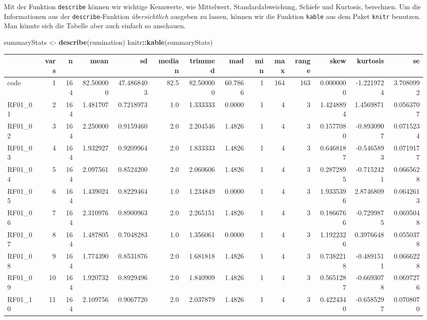 \documentclass[
  ngerman,
]{book}
\newenvironment{Shaded}{\begin{snugshade}}{\end{snugshade}}
\newcommand{\FunctionTok}[1]{\textcolor[rgb]{0.13,0.29,0.53}{\textbf{#1}}}
\newcommand{\NormalTok}[1]{#1}
\newcommand{\OtherTok}[1]{\textcolor[rgb]{0.56,0.35,0.01}{#1}}
\newcommand{\SpecialCharTok}[1]{\textcolor[rgb]{0.81,0.36,0.00}{\textbf{#1}}}
\begin{document}
Mit der Funktion \texttt{describe} können wir wichtige Kennwerte, wie Mittelwert, Standardabweichung, Schiefe und Kurtosis, berechnen. Um die Informationen aus der \texttt{describe}-Funktion \emph{übersichtlich} ausgeben zu lassen, können wir die Funktion \texttt{kable} aus dem Paket \texttt{knitr} benutzen. Man könnte sich die Tabelle aber auch einfach so anschauen.

\begin{Shaded}
\begin{Highlighting}[]
\NormalTok{summaryStats }\OtherTok{\textless{}{-}} \FunctionTok{describe}\NormalTok{(rumination)}
\NormalTok{knitr}\SpecialCharTok{::}\FunctionTok{kable}\NormalTok{(summaryStats)}
\end{Highlighting}
\end{Shaded}

\begin{tabular}{l|r|r|r|r|r|r|r|r|r|r|r|r|r}
\hline
  & vars & n & mean & sd & median & trimmed & mad & min & max & range & skew & kurtosis & se\\
\hline
code & 1 & 164 & 82.500000 & 47.4868403 & 82.5 & 82.500000 & 60.7866 & 1 & 164 & 163 & 0.0000000 & -1.2219724 & 3.7080992\\
\hline
RF01\_01 & 2 & 164 & 1.481707 & 0.7218973 & 1.0 & 1.333333 & 0.0000 & 1 & 4 & 3 & 1.4248894 & 1.4569871 & 0.0563707\\
\hline
RF01\_02 & 3 & 164 & 2.250000 & 0.9159460 & 2.0 & 2.204546 & 1.4826 & 1 & 4 & 3 & 0.1577080 & -0.8930907 & 0.0715234\\
\hline
RF01\_03 & 4 & 164 & 1.932927 & 0.9209964 & 2.0 & 1.833333 & 1.4826 & 1 & 4 & 3 & 0.6468187 & -0.5465893 & 0.0719177\\
\hline
RF01\_04 & 5 & 164 & 2.097561 & 0.8524200 & 2.0 & 2.060606 & 1.4826 & 1 & 4 & 3 & 0.2872895 & -0.7152421 & 0.0665628\\
\hline
RF01\_05 & 6 & 164 & 1.439024 & 0.8229464 & 1.0 & 1.234849 & 0.0000 & 1 & 4 & 3 & 1.9335396 & 2.8746809 & 0.0642613\\
\hline
RF01\_06 & 7 & 164 & 2.310976 & 0.8900963 & 2.0 & 2.265151 & 1.4826 & 1 & 4 & 3 & 0.1866766 & -0.7299875 & 0.0695048\\
\hline
RF01\_07 & 8 & 164 & 1.487805 & 0.7048283 & 1.0 & 1.356061 & 0.0000 & 1 & 4 & 3 & 1.1922326 & 0.3976648 & 0.0550378\\
\hline
RF01\_08 & 9 & 164 & 1.774390 & 0.8531876 & 2.0 & 1.681818 & 1.4826 & 1 & 4 & 3 & 0.7382218 & -0.4891511 & 0.0666228\\
\hline
RF01\_09 & 10 & 164 & 1.920732 & 0.8929496 & 2.0 & 1.840909 & 1.4826 & 1 & 4 & 3 & 0.5651287 & -0.6693078 & 0.0697276\\
\hline
RF01\_10 & 11 & 164 & 2.109756 & 0.9067720 & 2.0 & 2.037879 & 1.4826 & 1 & 4 & 3 & 0.4224340 & -0.6585297 & 0.0708070\\
\hline
\end{tabular}
\end{document}

